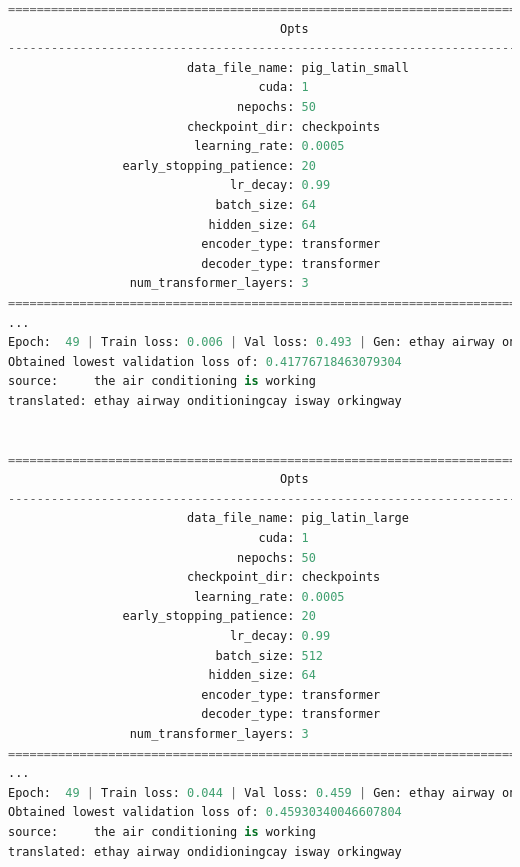 \documentclass{article}
\begin{document}
\begin{lstlisting}[language=Python]
================================================================================
                                      Opts                                      
--------------------------------------------------------------------------------
                         data_file_name: pig_latin_small                        
                                   cuda: 1                                      
                                nepochs: 50                                     
                         checkpoint_dir: checkpoints                            
                          learning_rate: 0.0005                                 
                early_stopping_patience: 20                                     
                               lr_decay: 0.99                                   
                             batch_size: 64                                     
                            hidden_size: 64                                     
                           encoder_type: transformer                            
                           decoder_type: transformer                            
                 num_transformer_layers: 3                                      
================================================================================
...
Epoch:  49 | Train loss: 0.006 | Val loss: 0.493 | Gen: ethay airway onditioningcay isway orkingway
Obtained lowest validation loss of: 0.41776718463079304
source:		the air conditioning is working 
translated:	ethay airway onditioningcay isway orkingway


================================================================================
                                      Opts                                      
--------------------------------------------------------------------------------
                         data_file_name: pig_latin_large                        
                                   cuda: 1                                      
                                nepochs: 50                                     
                         checkpoint_dir: checkpoints                            
                          learning_rate: 0.0005                                 
                early_stopping_patience: 20                                     
                               lr_decay: 0.99                                   
                             batch_size: 512                                    
                            hidden_size: 64                                     
                           encoder_type: transformer                            
                           decoder_type: transformer                            
                 num_transformer_layers: 3                                      
================================================================================
...
Epoch:  49 | Train loss: 0.044 | Val loss: 0.459 | Gen: ethay airway ondidioningcay isway orkingway
Obtained lowest validation loss of: 0.45930340046607804
source:		the air conditioning is working 
translated:	ethay airway ondidioningcay isway orkingway
\end{lstlisting}
\end{document}
